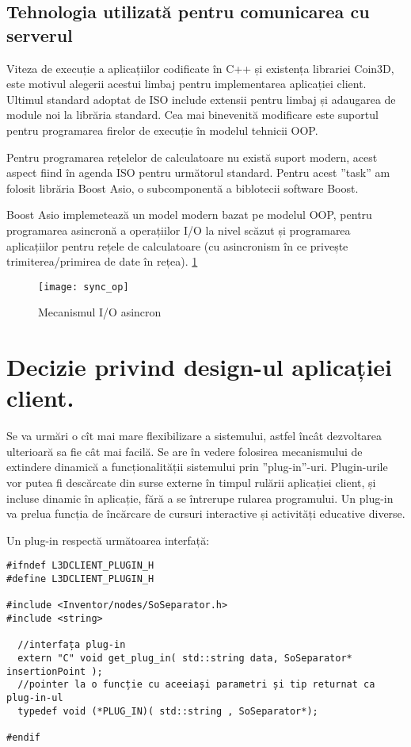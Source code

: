 \subsection{Tehnologia utilizată pentru comunicarea cu serverul}

\par Viteza de execuție a aplicațiilor codificate în C++ și existența librariei Coin3D, este motivul alegerii acestui limbaj pentru implementarea aplicației client. Ultimul standard adoptat de ISO include extensii pentru limbaj și adaugarea de module noi la librăria standard. Cea mai binevenită modificare este suportul pentru programarea firelor de execuție în modelul tehnicii OOP. 
\par Pentru programarea rețelelor de calculatoare nu există suport modern, acest aspect fiind în agenda ISO pentru următorul standard. Pentru acest ”task” am folosit librăria Boost Asio, o subcomponentă a biblotecii software Boost. 
\par Boost Asio implemetează un model modern bazat pe modelul OOP, pentru programarea asincronă a operațiilor I/O la nivel scăzut și programarea aplicațiilor pentru rețele de calculatoare (cu asincronism în ce privește trimiterea/primirea de date în rețea). \ref{fig:asio}

\begin{figure}[h]
    \centering
    \texttt{[image: sync\_op]}
    \caption{Mecanismul I/O asincron}
    \label{fig:asio}
\end{figure}

\section{Decizie privind design-ul aplicației client.}
\par Se va urmări o cît mai mare flexibilizare a sistemului, astfel încât dezvoltarea ulterioară sa fie cât mai facilă. Se are în vedere folosirea mecanismului de extindere dinamică a funcționalității sistemului prin ”plug-in”-uri. 	Plugin-urile vor putea fi descărcate din surse externe în timpul rulării aplicației client, și incluse dinamic în aplicație, fără a se întrerupe rularea programului. Un plug-in va prelua funcția de încărcare de cursuri interactive și activități educative diverse. 

	 Un plug-in respectă următoarea interfață:
\begin{verbatim}
#ifndef L3DCLIENT_PLUGIN_H
#define L3DCLIENT_PLUGIN_H

#include <Inventor/nodes/SoSeparator.h>
#include <string>
 
  //interfața plug-in
  extern "C" void get_plug_in( std::string data, SoSeparator* insertionPoint );
  //pointer la o funcție cu aceeiași parametri și tip returnat ca plug-in-ul
  typedef void (*PLUG_IN)( std::string , SoSeparator*);

#endif
\end{verbatim}	
	
